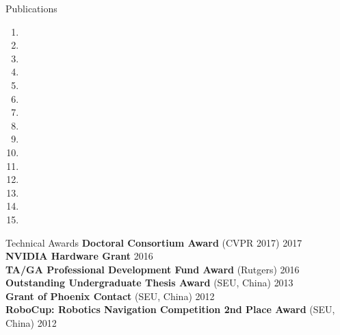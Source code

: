 \documentclass{resume} %
\begin{document}

%
\begin{rSection}{Publications}
\begin{enumerate}

\item {}

\item {}

\item {}

\item {}

\item {}

\item {}

\item{}

\item {}

\item {}

\item{}

\item {}

\item {}

\item {}


\item {}

\item {}

\end{enumerate}
\end{rSection}



\begin{rSection}{Technical Awards}
{\bf Doctoral Consortium Award} (CVPR 2017) \hfill {2017} \\
{\bf NVIDIA Hardware Grant} \hfill{2016} \\
{\bf TA/GA Professional Development Fund Award} (Rutgers) \hfill {2016}\\ 
{\bf Outstanding Undergraduate Thesis Award} (SEU, China) \hfill {2013}\\
{\bf Grant of Phoenix Contact} (SEU, China) \hfill {2012} \\
{\bf RoboCup: Robotics Navigation Competition 2nd Place Award} (SEU, China) \hfill {2012}

\end{rSection}
\end{document}
